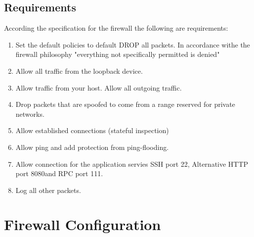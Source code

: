 \documentclass[a4paper,12pt]{report}
\begin{document}
\section{Requirements}
According the specification for the firewall the following are requirements:
\begin{enumerate}
  \item Set the default policies to default DROP all packets. In accordance withe the firewall philosophy "everything not specifically permitted is denied"
  \item Allow all traffic from the loopback device.
  \item Allow traffic from your host. Allow all outgoing traffic.
  \item Drop packets that are spoofed to come from a range reserved for private networks.
  \item Allow established connections (stateful inspection)
  \item Allow ping and add protection from ping-flooding.
  \item Allow connection for the application servies SSH port 22, Alternative HTTP port 8080and RPC port 111.
  \item Log all other packets.
\end{enumerate}
\newpage



\chapter{Firewall Configuration}

\newcommand{\para}[2]{\noindent\textbf{#1. #2}\newline}
\end{document}

